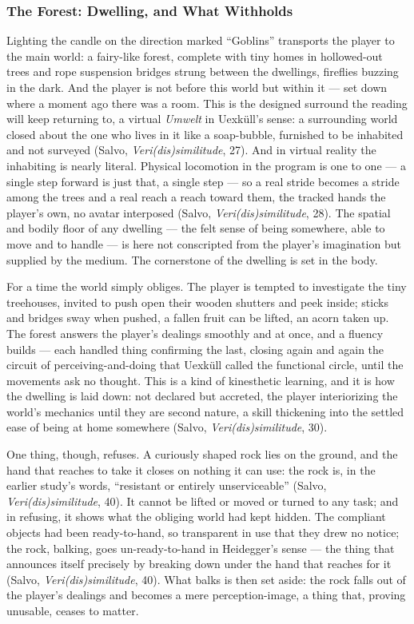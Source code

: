 \subsubsection*{The Forest: Dwelling, and What Withholds}

Lighting the candle on the direction marked ``Goblins'' transports the player to the main world: a fairy-like forest, complete with tiny homes in hollowed-out trees and rope suspension bridges strung between the dwellings, fireflies buzzing in the dark. And the player is not before this world but within it — set down where a moment ago there was a room. This is the designed surround the reading will keep returning to, a virtual \textit{Umwelt} in Uexküll's sense: a surrounding world closed about the one who lives in it like a soap-bubble, furnished to be inhabited and not surveyed (Salvo, \textit{Veri(dis)similitude}, 27). And in virtual reality the inhabiting is nearly literal. Physical locomotion in the program is one to one — a single step forward is just that, a single step — so a real stride becomes a stride among the trees and a real reach a reach toward them, the tracked hands the player's own, no avatar interposed (Salvo, \textit{Veri(dis)similitude}, 28). The spatial and bodily floor of any dwelling — the felt sense of being somewhere, able to move and to handle — is here not conscripted from the player's imagination but supplied by the medium. The cornerstone of the dwelling is set in the body.

For a time the world simply obliges. The player is tempted to investigate the tiny treehouses, invited to push open their wooden shutters and peek inside; sticks and bridges sway when pushed, a fallen fruit can be lifted, an acorn taken up. The forest answers the player's dealings smoothly and at once, and a fluency builds — each handled thing confirming the last, closing again and again the circuit of perceiving-and-doing that Uexküll called the functional circle, until the movements ask no thought. This is a kind of kinesthetic learning, and it is how the dwelling is laid down: not declared but accreted, the player interiorizing the world's mechanics until they are second nature, a skill thickening into the settled ease of being at home somewhere (Salvo, \textit{Veri(dis)similitude}, 30).

One thing, though, refuses. A curiously shaped rock lies on the ground, and the hand that reaches to take it closes on nothing it can use: the rock is, in the earlier study's words, ``resistant or entirely unserviceable'' (Salvo, \textit{Veri(dis)similitude}, 40). It cannot be lifted or moved or turned to any task; and in refusing, it shows what the obliging world had kept hidden. The compliant objects had been ready-to-hand, so transparent in use that they drew no notice; the rock, balking, goes un-ready-to-hand in Heidegger's sense — the thing that announces itself precisely by breaking down under the hand that reaches for it (Salvo, \textit{Veri(dis)similitude}, 40). What balks is then set aside: the rock falls out of the player's dealings and becomes a mere perception-image, a thing that, proving unusable, ceases to matter.

